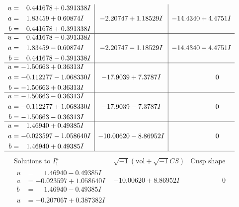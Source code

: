\documentclass[1p]{elsarticle_modified}
\theoremstyle{definition}
\newcommand{\I}{\sqrt{-1}}
\begin{document}
$$\begin{array}{c|c|c}
\begin{aligned}
u &= \phantom{-}0.441678 + 0.391338 I \\
a &= \phantom{-}1.83459 + 0.60874 I \\
b &= \phantom{-}0.441678 + 0.391338 I\end{aligned}
 & -2.20747 + 1.18529 I & -14.4340 + 4.4751 I \\ \hline\begin{aligned}
u &= \phantom{-}0.441678 - 0.391338 I \\
a &= \phantom{-}1.83459 - 0.60874 I \\
b &= \phantom{-}0.441678 - 0.391338 I\end{aligned}
 & -2.20747 - 1.18529 I & -14.4340 - 4.4751 I \\ \hline\begin{aligned}
u &= -1.50663 + 0.36313 I \\
a &= -0.112277 - 1.068330 I \\
b &= -1.50663 + 0.36313 I\end{aligned}
 & -17.9039 + 7.3787 I & \phantom{-0.000000 } 0 \\ \hline\begin{aligned}
u &= -1.50663 - 0.36313 I \\
a &= -0.112277 + 1.068330 I \\
b &= -1.50663 - 0.36313 I\end{aligned}
 & -17.9039 - 7.3787 I & \phantom{-0.000000 } 0 \\ \hline\begin{aligned}
u &= \phantom{-}1.46940 + 0.49385 I \\
a &= -0.023597 - 1.058640 I \\
b &= \phantom{-}1.46940 + 0.49385 I\end{aligned}
 & -10.00620 - 8.86952 I & \phantom{-0.000000 } 0\\
 \hline 
 \end{array}$$\newpage$$\begin{array}{c|c|c}  
\text{Solutions to }I^u_{1}& \I (\text{vol} + \sqrt{-1}CS) & \text{Cusp shape}\\
 \hline 
\begin{aligned}
u &= \phantom{-}1.46940 - 0.49385 I \\
a &= -0.023597 + 1.058640 I \\
b &= \phantom{-}1.46940 - 0.49385 I\end{aligned}
 & -10.00620 + 8.86952 I & \phantom{-0.000000 } 0 \\ \hline\begin{aligned}
u &= -0.207067 + 0.387382 I \\

\end{aligned}
\end{array}$$
\end{document}
